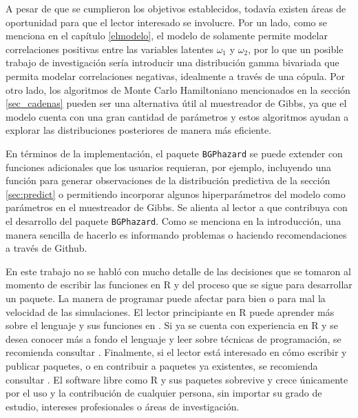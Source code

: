 \documentclass[11pt,a4paper]{article}
\begin{document}
A pesar de que se cumplieron los objetivos establecidos, todavía existen áreas de oportunidad para que el lector interesado se involucre. Por un lado, como se menciona en el capítulo \ref{elmodelo}, el modelo de \citet{nieto} solamente permite modelar correlaciones positivas entre las variables latentes $\omega_1$ y $\omega_2$, por lo que un posible trabajo de investigación sería introducir una distribución gamma bivariada que permita modelar correlaciones negativas, idealmente a través de una cópula.  Por otro lado, los algoritmos de Monte Carlo Hamiltoniano mencionados en la sección \ref{sec_cadenas} pueden ser una alternativa útil al muestreador de Gibbs, ya que el modelo cuenta con una gran cantidad de parámetros y estos algoritmos ayudan a explorar las distribuciones posteriores de manera más eficiente.

En términos de la implementación, el paquete \texttt{BGPhazard} se puede extender con funciones adicionales que los usuarios requieran, por ejemplo, incluyendo una función para generar observaciones de la distribución predictiva de la sección \ref{sec:predict} o permitiendo incorporar algunos hiperparámetros del modelo como parámetros en el muestreador de Gibbs. Se alienta al lector a que contribuya con el desarrollo del paquete \texttt{BGPhazard}. Como se menciona en la introducción, una manera sencilla de hacerlo es informando problemas o haciendo recomendaciones a través de Github.

En este trabajo no se habló con mucho detalle de las decisiones que se tomaron al momento de escribir las funciones en R y del proceso que se sigue para desarrollar un paquete. La manera de programar puede afectar para bien o para mal la velocidad de las simulaciones. El lector principiante en R puede aprender más sobre el lenguaje y sus funciones en \citet{rfordatascience}. Si ya se cuenta con experiencia en R y se desea conocer más a fondo el lenguaje y leer sobre técnicas de programación, se recomienda consultar \citet{advanced_r}. Finalmente, si el lector está interesado en cómo escribir y publicar paquetes, o en contribuir a paquetes ya existentes, se recomienda consultar \citet{rpackages}. El software libre como R y sus paquetes sobrevive y crece únicamente por el uso y la contribución de cualquier persona, sin importar su grado de estudio, intereses profesionales o áreas de investigación.

\newpage
\end{document}
